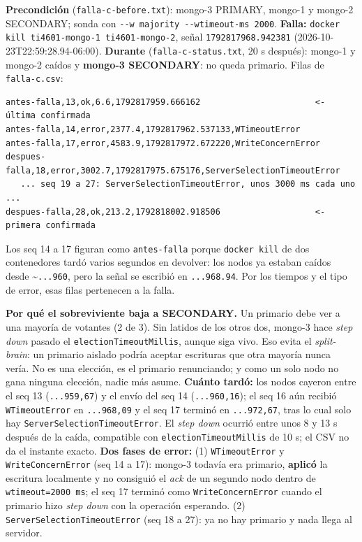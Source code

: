 \documentclass[10pt,letterpaper]{article}
\begin{document}
\textbf{Precondición} (\texttt{falla-c-before.txt}): mongo-3 PRIMARY, mongo-1 y mongo-2 SECONDARY; sonda con
\texttt{-{}-w majority -{}-wtimeout-ms 2000}. \textbf{Falla:} \texttt{docker kill ti4601-mongo-1
ti4601-mongo-2}, señal \texttt{1792817968.942381} (2026-10-23T22:59:28.94-06:00). \textbf{Durante}
(\texttt{falla-c-status.txt}, 20 s después): mongo-1 y mongo-2 caídos y \textbf{mongo-3 SECONDARY}: no queda
primario. Filas de \texttt{falla-c.csv}:
\begin{Verbatim}
antes-falla,13,ok,6.6,1792817959.666162                       <- última confirmada
antes-falla,14,error,2377.4,1792817962.537133,WTimeoutError
antes-falla,17,error,4583.9,1792817972.672220,WriteConcernError
despues-falla,18,error,3002.7,1792817975.675176,ServerSelectionTimeoutError
   ... seq 19 a 27: ServerSelectionTimeoutError, unos 3000 ms cada uno ...
despues-falla,28,ok,213.2,1792818002.918506                   <- primera confirmada
\end{Verbatim}
Los seq 14 a 17 figuran como \texttt{antes-falla} porque \texttt{docker kill} de dos contenedores tardó
varios segundos en devolver: los nodos ya estaban caídos desde \textasciitilde\texttt{...960}, pero la señal
se escribió en \texttt{...968.94}. Por los tiempos y el tipo de error, esas filas pertenecen a la falla.

\textbf{Por qué el sobreviviente baja a SECONDARY.} Un primario debe ver a una mayoría de votantes (2 de 3).
Sin latidos de los otros dos, mongo-3 hace \emph{step down} pasado el \texttt{electionTimeoutMillis}, aunque
siga vivo. Eso evita el \emph{split-brain}: un primario aislado podría aceptar escrituras que otra mayoría
nunca vería. No es una elección, es el primario renunciando; y como un solo nodo no gana ninguna elección,
nadie más asume. \textbf{Cuánto tardó:} los nodos cayeron entre el seq 13 (\texttt{...959,67}) y el envío del seq
14 (\texttt{...960,16}); el seq 16 aún recibió \texttt{WTimeoutError} en \texttt{...968,09} y el seq 17 terminó en
\texttt{...972,67}, tras lo cual solo hay \texttt{ServerSelectionTimeoutError}. El \emph{step down} ocurrió entre
unos 8 y 13 s después de la caída, compatible con \texttt{electionTimeoutMillis} de 10 s; el CSV no da el instante
exacto. \textbf{Dos fases de error:} (1) \texttt{WTimeoutError} y \texttt{WriteConcernError} (seq 14
a 17): mongo-3 todavía era primario, \textbf{aplicó} la escritura localmente y no consiguió el \emph{ack} de
un segundo nodo dentro de \texttt{wtimeout=2000 ms}; el seq 17 terminó como \texttt{WriteConcernError} cuando
el primario hizo \emph{step down} con la operación esperando. (2) \texttt{ServerSelectionTimeoutError} (seq
18 a 27): ya no hay primario y nada llega al servidor.
\end{document}
